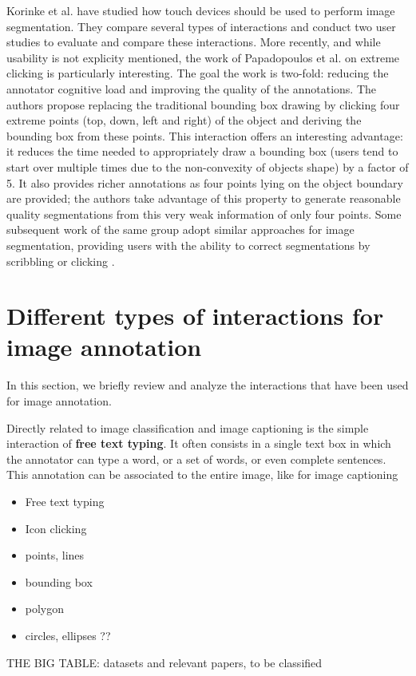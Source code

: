 Korinke et al. \cite{korinke_intuitive_2015,korinke_exploring_2015} have studied how touch devices should be used to perform image segmentation. They compare several types of interactions and conduct two user studies to evaluate and compare these interactions. More recently, and while usability is not explicity mentioned, the work of Papadopoulos et al. \cite{papadopoulos2017extreme} on extreme clicking is particularly interesting. The goal the work is two-fold: reducing the annotator cognitive load and improving the quality of the annotations. The authors propose replacing the traditional bounding box drawing by clicking four extreme points (top, down, left and right)  of the object and deriving the bounding box from these points. This interaction offers an interesting advantage: it reduces the time needed to appropriately draw a bounding box (users tend to start over multiple times due to the non-convexity of objects shape) by a factor of 5. It also provides richer annotations as four points lying on the object boundary are provided; the authors take advantage of this property to generate reasonable quality segmentations from this very weak information of only four points. Some subsequent work of the same group adopt similar approaches for image segmentation, providing users with the ability to correct segmentations by scribbling \cite{agustsson2018interactive} or clicking \cite{OpenImagesSegmentation}.


\section{Different types of interactions for image annotation}
\label{sec:annotation-types}
In this section, we briefly review and analyze the interactions that have been used for image annotation. 

Directly related to image classification and image captioning is the simple interaction of \textbf{free text typing}. It often consists in a single text box in which the annotator can type a word, or a set of words, or even complete sentences. This annotation can be associated to the entire image, like for image captioning 

\begin{itemize}
	\item Free text typing
	\item Icon clicking
	\item points, lines
	\item bounding box
	\item polygon
	\item circles, ellipses ??
\end{itemize}


THE BIG TABLE: datasets and relevant papers, to be classified


